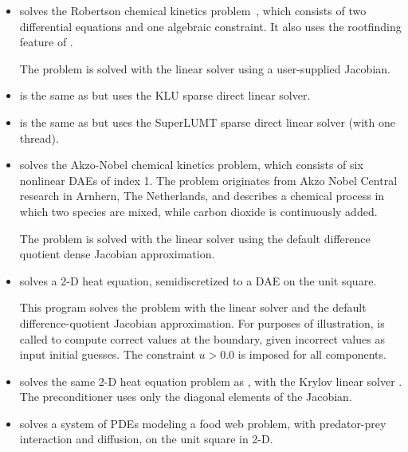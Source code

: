 \begin{itemize}


\item {}
  solves the Robertson chemical kinetics problem~\cite{Rob:66}, which consists
  of two differential equations and one algebraic constraint.  It also uses
  the rootfinding feature of {\idas}.

  The problem is solved with the {\idadense} linear solver using
  a user-supplied Jacobian.

\item {}
  is the same as  but uses the KLU sparse direct linear solver.

\item {}
  is the same as  but uses the SuperLUMT sparse direct linear solver
  (with one thread).

\item {}
  solves the Akzo-Nobel chemical kinetics problem, which consists
  of six nonlinear DAEs of index 1. 
  The problem originates from Akzo Nobel Central research in Arnhern,
  The Netherlands, and describes a chemical process in which two
  species are mixed, while carbon dioxide is continuously added.

  The problem is solved with the {\idadense} linear solver using the
  default difference quotient dense Jacobian approximation.

\item {}
  solves a 2-D heat equation, semidiscretized to a DAE on the unit square.

  This program solves the problem with the {\idaband} linear solver and
  the default difference-quotient Jacobian approximation. For purposes of
  illustration,  is called to compute correct values at the
  boundary, given incorrect values as input initial guesses. The constraint
  $u > 0.0$ is imposed for all components.

\item {}
  solves the same 2-D heat equation problem as , with the Krylov
  linear solver {\idaspgmr}. The preconditioner uses only the diagonal elements
  of the Jacobian.

\item {}
  solves a system of PDEs modeling a food web problem, with predator-prey
  interaction and diffusion, on the unit square in 2-D.


\end{itemize}
